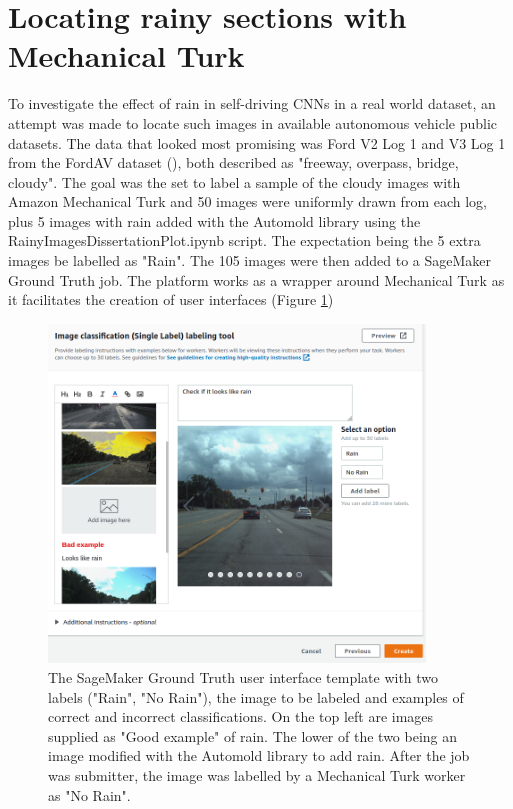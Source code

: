 \section{Locating rainy sections with Mechanical Turk}
\label{res:mech-turk}
To investigate the effect of rain in self-driving CNNs in a real world dataset, an attempt was made to locate such images in available autonomous vehicle public datasets.
The data that looked most promising was Ford V2 Log 1 and V3 Log 1 from the FordAV dataset (\cite{agarwal2020ford}), both described as "freeway, overpass, bridge, cloudy". The goal was the set to label a sample of the cloudy images with Amazon Mechanical Turk and 50 images were uniformly drawn from each log, plus 5 images with rain added with the Automold library using the RainyImagesDissertationPlot.ipynb script. The expectation being the 5 extra images be labelled as "Rain". The 105 images were then added to a SageMaker Ground Truth job. The platform works as a wrapper around Mechanical Turk as it facilitates the creation of user interfaces (Figure \ref{fig:MechTurkCreateJob})
\begin{figure}[h!]
\centering
\includegraphics[width=10cm]{Figures/MechTurkCreateJob.png}
\caption{The SageMaker Ground Truth user interface template with two labels ("Rain", "No Rain"), the image to be labeled and examples of correct and incorrect classifications. On the top left are images supplied as "Good example" of rain. The lower of the two being an image modified with the Automold library to add rain. After the job was submitter, the image was labelled by a Mechanical Turk worker as "No Rain".}
\label{fig:MechTurkCreateJob}
\end{figure}
